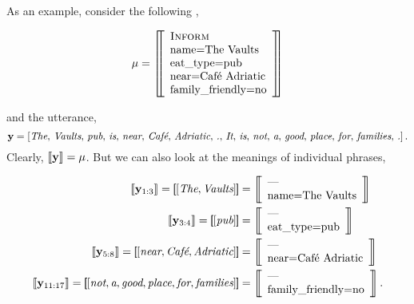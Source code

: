 As an example, consider the following \meaningrepresentation,
\begin{singlespace}
\[
    \mu = \left[\!\!\left[ \begin{array}{l}
        \textsc{Inform} \\
        \textrm{name=The Vaults}\\
        \textrm{eat\_type=pub}\\
        \textrm{near=Caf{\'e} Adriatic}\\
        \textrm{family\_friendly=no}\\
\end{array}\right]\!\!\right] 
\]
\end{singlespace}
and the utterance,
\[\mathbf{y} = \left[ \textit{The},\,\textit{Vaults},\,\textit{pub},\,\textit{is},\,\textit{near},\,\textit{Caf{\'e}},\,\textit{Adriatic},\,\textit{.},\,\textit{It},\,\textit{is},\,\textit{not},\,\textit{a},\,\textit{good},\,\textit{place},\,\textit{for},\,\textit{families},\,\textit{.}\right]. \]
\noindent Clearly, $\left\llbracket \mathbf{y} \right\rrbracket = \mu$. But we can also look at the meanings of individual
phrases,\begin{singlespace}
    \begin{align*}
        \denotes{\utttoks_{1:3}} = \left[\!\!\left[ \left[\textit{The}, \textit{Vaults}  \right] \right]\!\!\right] & = \left[\!\!\left[
\begin{array}{l} \textrm{---} \\ \AV{name}{The Vaults}\end{array} \right]\!\!\right] \\
    \denotes{\utttoks_{3:4}} = \left[\!\!\left[ \left[\textit{pub}  \right] \right]\!\!\right] &= \left[\!\!\left[
\begin{array}{l} \textrm{---} \\ \AV{eat\_type}{pub}\end{array} \right]\!\!\right] \\
    \denotes{\utttoks_{5:8}} = \left[\!\!\left[ \left[\textit{near}, \textit{Caf{\'e}}, \textit{Adriatic}  \right] \right]\!\!\right] & = \left[\!\!\left[
\begin{array}{l} \textrm{---} \\ \AV{near}{Caf{\'e} Adriatic}\end{array} \right]\!\!\right] \\
    \denotes{\utttoks_{11:17}} = \left[\!\!\left[ \left[\textit{not}, \textit{a}, \textit{good}, \textit{place}, \textit{for}, \textit{families}  \right] \right]\!\!\right] & = \left[\!\!\left[
\begin{array}{l} \textrm{---} \\ \AV{family\_friendly}{no}\end{array} \right]\!\!\right]. 
\end{align*}
\end{singlespace}

